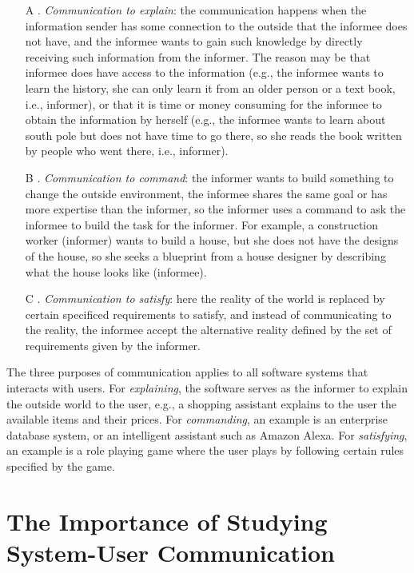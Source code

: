 \begin{enumerate}
	\item[A]. \textit{Communication to explain}: the communication happens when the information sender has some connection to the outside that the informee does not have, and the informee wants to gain such knowledge by directly receiving such information from the informer. The reason may be that informee does have access to the information (e.g., the informee wants to learn the history, she can only learn it from an older person or a text book, i.e., informer), or that it is time or money consuming for the informee to obtain the information by herself (e.g., the informee wants to learn about south pole but does not have time to go there, so she reads the book written by people who went there, i.e., informer). 
	\item[B]. \textit{Communication to command}: the informer wants to build something to change the outside environment, the informee shares the same goal or has more expertise than the informer, so the informer uses a command to ask the informee to build the task for the informer. For example, a construction worker (informer) wants to build a house, but she does not have the designs of the house, so she seeks a blueprint from a house designer by describing what the house looks like (informee). 
	\item[C]. \textit{Communication to satisfy}: here the reality of the world is replaced by certain specificed requirements to satisfy, and instead of communicating to the reality, the informee accept the alternative reality defined by the set of requirements given by the informer. 
\end{enumerate}

The three purposes of communication applies to all software systems that interacts with users. For \textit{explaining}, the software serves as the informer to explain the outside world to the user, e.g., a shopping assistant explains to the user the available items and their prices. For \textit{commanding}, an example is an enterprise database system, or an intelligent assistant such as Amazon Alexa. For \textit{satisfying}, an example is a role playing game where the user plays by following certain rules specified by the game. 

\section{The Importance of Studying System-User Communication}

